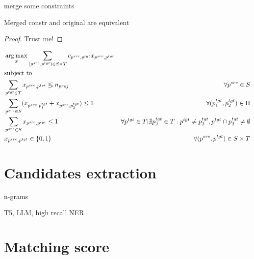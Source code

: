 merge some constraints
\begin{theorem}
    Merged constr and original are equivalent
\end{theorem}
\begin{proof}
    Trust me!
\end{proof}

\begin{equation}
    \begin{aligned}
         & \operatorname*{arg\,max}\limits_x \sum\limits_{(p^{src}, p^{tgt}) \in S \times T} c_{p^{src}, p^{tgt}} x_{p^{src}, p^{tgt}}                                                                                                                   \\
         & \text{subject to} \notag                                                                                                                                                                                                     \\
         & \sum\limits_{p^{tgt} \in T} x_{p^{src}, p^{tgt}} \lessgtr n_{proj}                                         & \forall p^{src} \in S                                                                                           \\
         & \sum\limits_{p^{src} \in S} (x_{p^{src}, p_1^{tgt}} + x_{p^{src}, p_2^{tgt}}) \leq 1                       & \forall (p_1^{tgt}, p_2^{tgt}) \in \Pi                                                                          \\
         & \sum\limits_{p^{src} \in S} x_{p^{src}, p^{tgt}} \leq 1                                                    & \forall p^{tgt} \in T | \nexists p_2^{tgt} \in T: p^{tgt} \neq p_2^{tgt}, p^{tgt} \cap p_2^{tgt} \neq \emptyset \\
         & x_{p^{src}, p^{tgt}} \in \{ 0, 1 \}                                                                        & \forall (p^{src}, p^{tgt}) \in S \times T
    \end{aligned}
\end{equation}

\section{Candidates extraction}
n-grams

T5, LLM, high recall NER

\section{Matching score}
